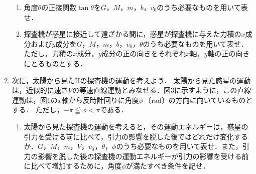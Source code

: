\begin{enumerate}[I]
\begin{enumerate}[(1), resume]
    \item {\hzw}角度$\theta$の正接関数$\tan\theta$を$G$，$M$，$m$，$b$，$v_0$のうち必要なものを用いて表せ．
    \item {\hzw}探査機が惑星に接近して遠ざかる間に，惑星が探査機に与えた力積の$x$成分および$y$成分を$G$，$M$，$m$，$b$，$v_0$，$\theta$のうち必要なものを用いて表せ．ただし，力積の$x$成分，$y$成分の正の向きをそれぞれ$x$軸，$y$軸の正の向きにとるものとする． 
  \end{enumerate}
  \item {\hzw}次に，太陽から見たIIの探査機の運動を考えよう．
  太陽から見た惑星の運動は，近似的に速さ$V$の等速直線運動とみなせる．図3に示すように，この直線運動は，図1の$x$軸から反時計回りに角度$\phi \, \text{〔rad〕}$の方向に向いているものとする．
  ただし，$-\pi \leqq \phi <\pi$である．
  \begin{enumerate}[(1), resume]
    \item {\hzw}太陽から見た探査機の運動を考えると，その運動エネルギーは，惑星の引力を受ける前に比べて，引力の影響を脱した後ではどれだけ変化するか．$G$，$M$，$m$，$V$，$v_0$，$\theta$，$\phi$のうち必要なものを用いて表せ．また，引力の影響を脱した後の探査機の運動エネルギーが引力の影響を受ける前に比べて増加するために，角度$\phi$が満たすべき条件を記せ．
  \end{enumerate}
\end{enumerate}



